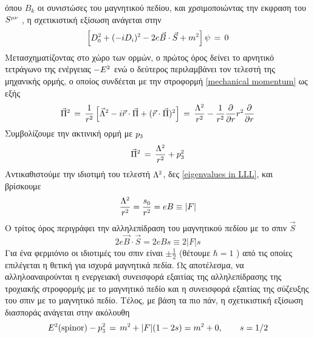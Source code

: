 όπου $B_k$ οι συνιστώσες του μαγνητικού πεδίου, και χρσιμοποιώντας την εκφραση του $S\superscr{\mu\nu}$ \cite{Peskin:1995ev}, η σχετικιστική εξίσωση ανάγεται στην
\begin{equation}\label{relativistic energy equation}
    \left[ D\superscr{2}\subscr{0}+(-iD\subscr{i})\superscr{2}-2e\Vec{B}\cdot\Vec{S}+m\superscr{2} \right]\psi\,=\,0
\end{equation}
Μετασχηματίζοντας στο χώρο των ορμών, ο πρώτος όρος δείνει το αρνητικό τετράγωνο της ενέργειας $-E\superscr{2}$ 
ενώ ο δεύτερος περιλαμβάνει τον τελεστή της μηχανικής ορμής, ο οποίος συνδέεται με την στροφορμή \eqref{mechanical momentum} ως εξής
\begin{equation}
    \Vec{\Pi}\superscr{2}\,=\,\frac{1}{r\superscr{2}}\left[ \Vec{\Lambda}\superscr{2}-i\Vec{r}\cdot\Vec{\Pi}+(\Vec{r}\cdot\Vec{\Pi})\superscr{2} \right]\,=\,\frac{\Lambda\superscr{2}}{r\superscr{2}}-\frac{1}{r\superscr{2}}\frac{\partial}{\partial r}r\superscr{2}\frac{\partial}{\partial r}
\end{equation}
Συμβολίζουμε την ακτινική ορμή με $p\subscr{3}$ 
\begin{equation}
     \Vec{\Pi}\superscr{2}\,=\,\frac{\Lambda\superscr{2}}{r\superscr{2}}+p\subscr{3}\superscr{2}
\end{equation}
Αντικαθιστούμε την ιδιοτιμή του τελεστή $\Lambda\superscr{2}$, δες \eqref{eigenvalues in LLL}, και βρίσκουμε 
\begin{equation}
    \frac{\Lambda\superscr{2}}{r\superscr{2}}=\frac{s\subscr{0}}{r\superscr{2}}=eB\equiv |F|
\end{equation}
Ο τρίτος όρος περιγράφει την αλληλεπίδραση του μαγνητικού πεδίου με το σπιν $\Vec{S}$
\begin{equation}
    2e\Vec{B}\cdot\Vec{S} = 2eBs \equiv 2|F|s
\end{equation}
Για ένα φερμιόνιο οι ιδιοτιμές του σπιν είναι $\pm\frac{1}{2}$ (θέτουμε $\hbar=1$ ) από τις οποίες επιλέγεται η θετική για ισχυρά μαγνητικά πεδία. Ως αποτέλεσμα, να αλληλοαναιρούνται η ενεργειακή συνεισφορά εξαιτίας της αλληλεπίδρασης της τροχιακής στροφορμής με το μαγνητικό πεδίο και η συνεισφορά εξαιτίας της σύζευξης του σπιν με το μαγνητικό πεδίο. 
Τέλος, με βάση τα πιο πάν, η σχετικιστική εξίσωση διασποράς ανάγεται στην ακόλουθη
\begin{equation}\label{spinor energy magnetic field}
    E\superscr{2}(\text{spinor})-p\subscr{3}\superscr{2}\,=\,m\superscr{2}+|F|(1-2s)=m\superscr{2}+0,\qquad s=1/2
\end{equation}
\\

